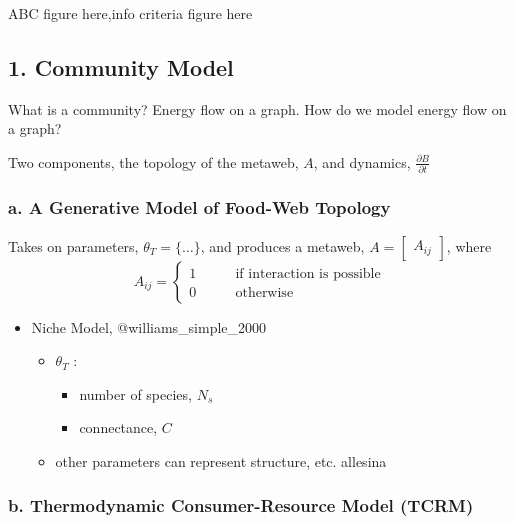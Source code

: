 ABC figure here,info criteria figure here

\hypertarget{community-model}{%
\subsection{1. Community Model}\label{community-model}}

What is a community? Energy flow on a graph. How do we model energy flow
on a graph?

Two components, the topology of the metaweb, \(A\), and dynamics,
\(\frac{\partial B}{\partial t}\)

\hypertarget{a.-a-generative-model-of-food-web-topology}{%
\subsubsection{a. A Generative Model of Food-Web
Topology}\label{a.-a-generative-model-of-food-web-topology}}

Takes on parameters, \(\theta_T = \{\dots\}\), and produces a metaweb,
\(A = \begin{bmatrix} A_{ij} \end{bmatrix}\), where
\[A_{ij} = \begin{cases}1 \quad\quad& \text{if interaction is possible} \\ 0 & \text{otherwise}\end{cases}\]

\begin{itemize}
\tightlist
\item
  Niche Model, @williams\_simple\_2000

  \begin{itemize}
  \tightlist
  \item
    \(\theta_T\) :

    \begin{itemize}
    \tightlist
    \item
      number of species, \(N_s\)
    \item
      connectance, \(C\)
    \end{itemize}
  \item
    other parameters can represent structure, etc. allesina
  \end{itemize}
\end{itemize}

\hypertarget{b.-thermodynamic-consumer-resource-model-tcrm}{%
\subsubsection{b. Thermodynamic Consumer-Resource Model
(TCRM)}\label{b.-thermodynamic-consumer-resource-model-tcrm}}

